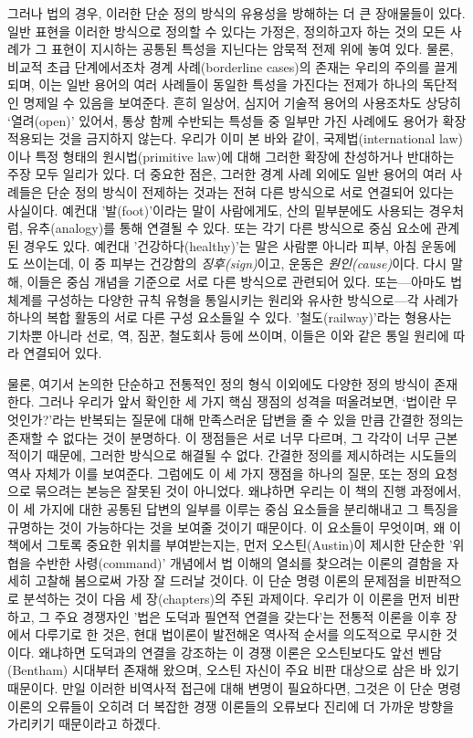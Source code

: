 \documentclass[12pt, oneside]{book}  %
\begin{document}
그러나 법의 경우, 이러한 단순 정의 방식의 유용성을 방해하는 더 큰
장애물들이 있다. 일반 표현을 이러한 방식으로 정의할 수 있다는 가정은,
정의하고자 하는 것의 모든 사례가 그 표현이 지시하는 공통된 특성을
지닌다는 암묵적 전제 위에 놓여 있다. 물론, 비교적 초급 단계에서조차 경계
사례(borderline cases)의 존재는 우리의 주의를 끌게 되며, 이는 일반
용어의 여러 사례들이 동일한 특성을 가진다는 전제가 하나의 독단적인
명제일 수 있음을 보여준다. 흔히 일상어, 심지어 기술적 용어의 사용조차도
상당히 `열려(open)' 있어서, 통상 함께 수반되는 특성들 중 일부만 가진
사례에도 용어가 확장 적용되는 것을 금지하지 않는다. 우리가 이미 본 바와
같이, 국제법(international law)이나 특정 형태의 원시법(primitive law)에
대해 그러한 확장에 찬성하거나 반대하는 주장 모두 일리가 있다. 더 중요한
점은, 그러한 경계 사례 외에도 일반 용어의 여러 사례들은 단순 정의 방식이
전제하는 것과는 전혀 다른 방식으로 서로 연결되어 있다는 사실이다. 예컨대
'발(foot)'이라는 말이 사람에게도, 산의 밑부분에도 사용되는 경우처럼,
유추(analogy)를 통해 연결될 수 있다. 또는 각기 다른 방식으로 중심 요소에
관계된 경우도 있다. 예컨대 '건강하다(healthy)'는 말은 사람뿐 아니라
피부, 아침 운동에도 쓰이는데, 이 중 피부는 건강함의
\emph{징후(sign)}이고, 운동은 \emph{원인(cause)}이다. 다시 말해, 이들은
중심 개념을 기준으로 서로 다른 방식으로 관련되어 있다. 또는---아마도
법체계를 구성하는 다양한 규칙 유형을 통일시키는 원리와 유사한
방식으로---각 사례가 하나의 복합 활동의 서로 다른 구성 요소들일 수 있다.
'철도(railway)'라는 형용사는 기차뿐 아니라 선로, 역, 짐꾼, 철도회사 등에
쓰이며, 이들은 이와 같은 통일 원리에 따라 연결되어 있다.

물론, 여기서 논의한 단순하고 전통적인 정의 형식 이외에도 다양한 정의
방식이 존재한다. 그러나 우리가 앞서 확인한 세 가지 핵심 쟁점의 성격을
떠올려보면, `법이란 무엇인가?'라는 반복되는 질문에 대해 만족스러운
답변을 줄 수 있을 만큼 간결한 정의는 존재할 수 없다는 것이 분명하다. 이
쟁점들은 서로 너무 다르며, 그 각각이 너무 근본적이기 때문에, 그러한
방식으로 해결될 수 없다. 간결한 정의를 제시하려는 시도들의 역사 자체가
이를 보여준다. 그럼에도 이 세 가지 쟁점을 하나의 질문, 또는 정의
요청으로 묶으려는 본능은 잘못된 것이 아니었다. 왜냐하면 우리는 이 책의
진행 과정에서, 이 세 가지에 대한 공통된 답변의 일부를 이루는 중심
요소들을 분리해내고 그 특징을 규명하는 것이 가능하다는 것을 보여줄
것이기 때문이다. 이 요소들이 무엇이며, 왜 이 책에서 그토록 중요한 위치를
부여받는지는, 먼저 오스틴(Austin)이 제시한 단순한 '위협을 수반한
사령(command)' 개념에서 법 이해의 열쇠를 찾으려는 이론의 결함을 자세히
고찰해 봄으로써 가장 잘 드러날 것이다. 이 단순 명령 이론의 문제점을
비판적으로 분석하는 것이 다음 세 장(chapters)의 주된 과제이다. 우리가 이
이론을 먼저 비판하고, 그 주요 경쟁자인 '법은 도덕과 필연적 연결을
갖는다'는 전통적 이론을 이후 장에서 다루기로 한 것은, 현대 법이론이
발전해온 역사적 순서를 의도적으로 무시한 것이다. 왜냐하면 도덕과의
연결을 강조하는 이 경쟁 이론은 오스틴보다도 앞선 벤담(Bentham) 시대부터
존재해 왔으며, 오스틴 자신이 주요 비판 대상으로 삼은 바 있기 때문이다.
만일 이러한 비역사적 접근에 대해 변명이 필요하다면, 그것은 이 단순 명령
이론의 오류들이 오히려 더 복잡한 경쟁 이론들의 오류보다 진리에 더 가까운
방향을 가리키기 때문이라고 하겠다.
\end{document}
